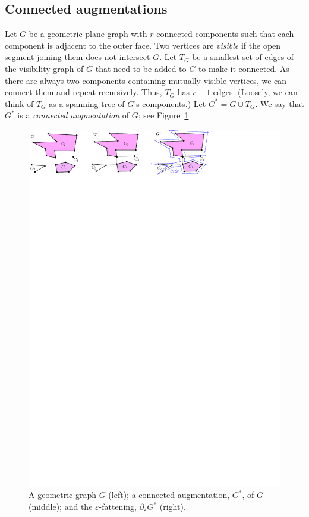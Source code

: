 \documentclass{patmorin}
\begin{document}
\subsection{Connected augmentations}\label{section: connected augmentations}
Let $G$ be a geometric plane graph with $r$ connected components such that each component is adjacent to the outer face.
Two vertices are {\em visible} if the open segment joining them does not intersect $G$.
Let $T_G$ be a smallest set of edges of the visibility graph of $G$ that need to be added to $G$ to make it connected.
As there are always two components containing mutually visible vertices, we can connect them and repeat recursively.  Thus, $T_G$ has $r-1$ edges. (Loosely, we can think of $T_G$ as a spanning tree of $G$'s components.) Let $G^* = G\cup T_G$.  We say that $G^*$ is a \emph{connected augmentation} of $G$; see Figure~\ref{fig:Blowing}.

\begin{figure}[h]
\centering
\includegraphics{img/Blowing.pdf}
\caption{\small A geometric graph $G$ (left); a connected augmentation, $G^*$, of $G$ (middle); and the $\varepsilon$-fattening, $\partial_\varepsilon G^*$ (right).}
\label{fig:Blowing}
\end{figure}
\end{document}
